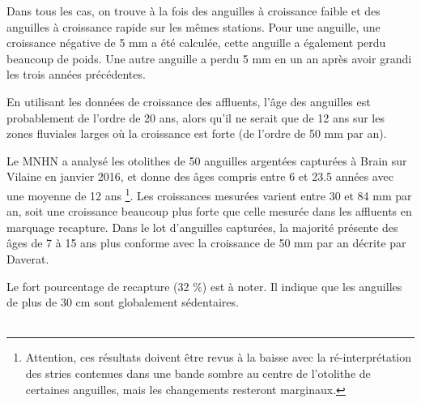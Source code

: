 \documentclass[10pt,twocolumn,titlepage,twoside]{article}\usepackage[]{graphicx}\usepackage[]{color}
\begin{document}
Dans tous les cas,  on
trouve à la fois des anguilles à croissance faible et des anguilles à croissance
rapide sur les mêmes stations. Pour une anguille, une croissance négative de 5
mm a été calculée, cette anguille a également perdu beaucoup de poids. Une autre
anguille a perdu 5 mm en un an après avoir grandi les trois années précédentes.

En utilisant les données de croissance des affluents, l'âge des anguilles est
probablement de l'ordre de 20 ans, alors qu'il ne serait que de 12 ans sur les
zones fluviales larges où la croissance est forte (de l'ordre de 50 mm par an). 

Le MNHN a analysé les otolithes de 50 anguilles argentées capturées à
Brain sur Vilaine en janvier 2016, et donne des âges compris entre 6 et 23.5
années avec une moyenne de 12 ans \footnote{Attention, ces résultats doivent être revus à la baisse avec
la ré-interprétation des stries contenues dans une bande sombre au centre de l'otolithe de certaines anguilles, mais les changements resteront marginaux.}. Les croissances mesurées varient entre 30 et 84
mm par an, soit une croissance beaucoup plus forte que celle mesurée dans les
affluents en marquage recapture. Dans le lot d'anguilles capturées, la majorité
présente des âges de 7 à 15 ans plus conforme avec la croissance de 50 mm par an
décrite par Daverat.


Le fort pourcentage de recapture (32 \%) est à noter.
Il indique que les anguilles de plus de 30 cm sont globalement
sédentaires.\\ 

 \\ \mediumskip
\end{document}
